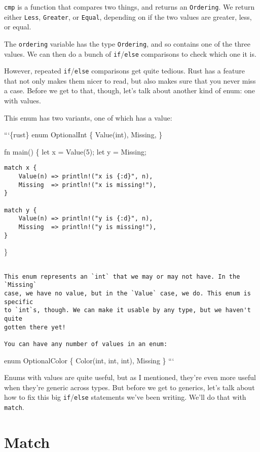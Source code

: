 \documentclass[]{article}
\begin{document}
\texttt{cmp} is a function that compares two things, and returns an
\texttt{Ordering}. We return either \texttt{Less}, \texttt{Greater}, or
\texttt{Equal}, depending on if the two values are greater, less, or
equal.

The \texttt{ordering} variable has the type \texttt{Ordering}, and so
contains one of the three values. We can then do a bunch of
\texttt{if}/\texttt{else} comparisons to check which one it is.

However, repeated \texttt{if}/\texttt{else} comparisons get quite
tedious. Rust has a feature that not only makes them nicer to read, but
also makes sure that you never miss a case. Before we get to that,
though, let's talk about another kind of enum: one with values.

This enum has two variants, one of which has a value:

```\{rust\} enum OptionalInt \{ Value(int), Missing, \}

fn main() \{ let x = Value(5); let y = Missing;

\begin{verbatim}
match x {
    Value(n) => println!("x is {:d}", n),
    Missing  => println!("x is missing!"),
}

match y {
    Value(n) => println!("y is {:d}", n),
    Missing  => println!("y is missing!"),
}
\end{verbatim}

\}

\begin{verbatim}

This enum represents an `int` that we may or may not have. In the `Missing`
case, we have no value, but in the `Value` case, we do. This enum is specific
to `int`s, though. We can make it usable by any type, but we haven't quite
gotten there yet!

You can have any number of values in an enum:
\end{verbatim}

enum OptionalColor \{ Color(int, int, int), Missing \} ```

Enums with values are quite useful, but as I mentioned, they're even
more useful when they're generic across types. But before we get to
generics, let's talk about how to fix this big \texttt{if}/\texttt{else}
statements we've been writing. We'll do that with \texttt{match}.

\section{Match}\label{match}
\end{document}
